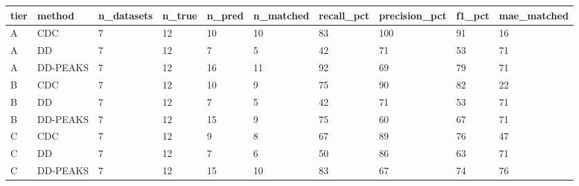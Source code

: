 \begin{tabular}{llllllllll}
\toprule
tier & method & n_datasets & n_true & n_pred & n_matched & recall_pct & precision_pct & f1_pct & mae_matched \\
\midrule
A & CDC & 7 & 12 & 10 & 10 & 83 & 100 & 91 & 16 \\
A & DD & 7 & 12 & 7 & 5 & 42 & 71 & 53 & 71 \\
A & DD-PEAKS & 7 & 12 & 16 & 11 & 92 & 69 & 79 & 71 \\
B & CDC & 7 & 12 & 10 & 9 & 75 & 90 & 82 & 22 \\
B & DD & 7 & 12 & 7 & 5 & 42 & 71 & 53 & 71 \\
B & DD-PEAKS & 7 & 12 & 15 & 9 & 75 & 60 & 67 & 71 \\
C & CDC & 7 & 12 & 9 & 8 & 67 & 89 & 76 & 47 \\
C & DD & 7 & 12 & 7 & 6 & 50 & 86 & 63 & 71 \\
C & DD-PEAKS & 7 & 12 & 15 & 10 & 83 & 67 & 74 & 76 \\
\bottomrule
\end{tabular}
